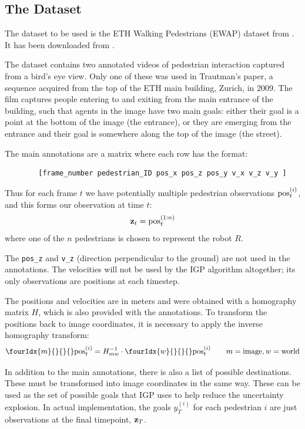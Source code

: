 \documentclass[a4paper,11pt,headings=small]{article}
\begin{document}
\subsection*{The Dataset}
\quad The dataset to be used is the ETH Walking Pedestrians (EWAP) dataset from \cite{Pellegrini2009}. It has been downloaded from \cite{dataset}.

The dataset contains two annotated videos of pedestrian interaction captured from a bird's eye view. Only one of these was used in Trautman's paper, a sequence acquired from the top of the ETH main building, Zurich, in 2009. The film captures people entering to and exiting from the main entrance of the building, such that agents in the image have two main goals: either their goal is a point at the bottom of the image (the entrance), or they are emerging from the entrance and their goal is somewhere along the top of the image (the street).

The main annotations are a matrix where each row has the format:
\begin{verbatim}
        [frame_number pedestrian_ID pos_x pos_z pos_y v_x v_z v_y ]
\end{verbatim}

Thus for each frame $t$ we have potentially multiple pedestrian observations $\mathrm{pos}^{(i)}_t$, and this forms our observation at time $t$:
$$ \mathbf{z}_t = \mathrm{pos}^{(1:n)}_t $$
where one of the $n$ pedestrians is chosen to represent the robot $R$.

The \texttt{pos\_z} and \texttt{v\_z} (direction perpendicular to the ground) are not used in the annotations. The velocities will not be used by the IGP algorithm altogether; its only observations are positions at each timestep.

The positions and velocities are in meters and were obtained with a homography matrix $H$, which is also provided with the annotations. To transform the positions back to image coordinates, it is necessary to apply the inverse homography transform:
$$ \fourIdx{m}{}{}{}\post = H_{mw}^{-1} \cdot \fourIdx{w}{}{}{}\post \qquad m = \mathrm{image}, w = \mathrm{world} $$

In addition to the main annotations, there is also a list of possible destinations. These must be transformed into image coordinates in the same way. These can be used as the set of possible goals that IGP uses to help reduce the uncertainty explosion. In actual implementation, the goals $y^{(i)}_T$ for each pedestrian $i$ are just observations at the final timepoint, $\mathbf{z}_T$.
\end{document}
